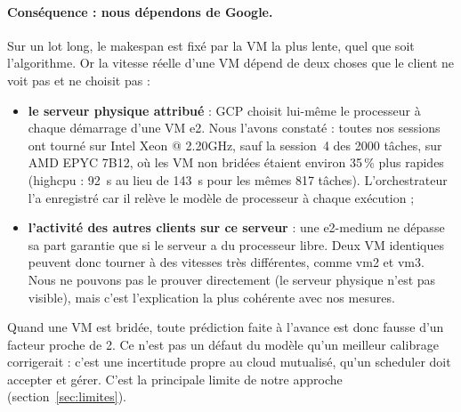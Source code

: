 \paragraph{Conséquence : nous dépendons de Google.} Sur un lot long, le makespan
est fixé par la VM la plus lente, quel que soit l'algorithme. Or la vitesse réelle
d'une VM dépend de deux choses que le client ne voit pas et ne choisit pas :
\begin{itemize}
  \item \textbf{le serveur physique attribué} : GCP choisit lui-même le processeur
        à chaque démarrage d'une VM e2. Nous l'avons constaté : toutes nos sessions
        ont tourné sur Intel Xeon @ 2.20GHz, sauf la session~4 des 2000 tâches, sur
        AMD EPYC 7B12, où les VM non bridées étaient environ 35\,\% plus rapides
        (highcpu : 92~s au lieu de 143~s pour les mêmes 817 tâches).
        L'orchestrateur l'a enregistré car il relève le modèle de processeur à
        chaque exécution ;
  \item \textbf{l'activité des autres clients sur ce serveur} : une e2-medium ne
        dépasse sa part garantie que si le serveur a du processeur libre. Deux VM
        identiques peuvent donc tourner à des vitesses très différentes, comme vm2
        et vm3. Nous ne pouvons pas le prouver directement (le serveur physique
        n'est pas visible), mais c'est l'explication la plus cohérente avec nos
        mesures.
\end{itemize}
Quand une VM est bridée, toute prédiction faite à l'avance est donc fausse d'un
facteur proche de 2. Ce n'est pas un défaut du modèle qu'un meilleur calibrage
corrigerait : c'est une incertitude propre au cloud mutualisé, qu'un scheduler
doit accepter et gérer. C'est la principale limite de notre approche
(section~\ref{sec:limites}).
